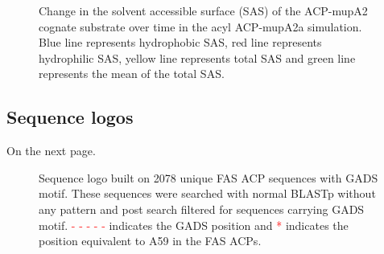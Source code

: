 \begin{singlespacing}
		\setlength\fboxsep{5pt}
		\setlength\fboxrule{1.5pt}
		\begin{figure}[htbp]
		\centering
		\caption[Change in the solvent accessible surface (SAS) of the ACP-mupA2 cognate substrate over time in the acyl ACP-mupA2a simulation.]{Change in the solvent accessible surface (SAS) of the ACP-mupA2 cognate substrate over time in the acyl ACP-mupA2a simulation. Blue line represents hydrophobic SAS, red line represents hydrophilic SAS, yellow line represents total SAS and green line represents the mean of the total SAS.}
		\label{fig:sasACP2_area}
		\end{figure}		

\clearpage
	\subsection{Sequence logos}
	\label{sec:sequence logos}		
	On the next page. 
		
		\setlength\fboxsep{5pt}
		\setlength\fboxrule{1.5pt}
		\begin{figure}
		\centering
		\caption[Sequence logo built on 2078 unique FAS ACP sequences with GADS motif.]{Sequence logo built on 2078 unique FAS ACP sequences with GADS motif. These sequences were searched with normal BLASTp without any pattern and post search filtered for sequences carrying GADS motif. \textcolor{red}{- - - - -} indicates the GADS position and \textcolor{red}{*} indicates the position equivalent to A59 in the FAS ACPs.}
		\label{fig:gadsnopattern}
		\end{figure}	


\end{singlespacing}
